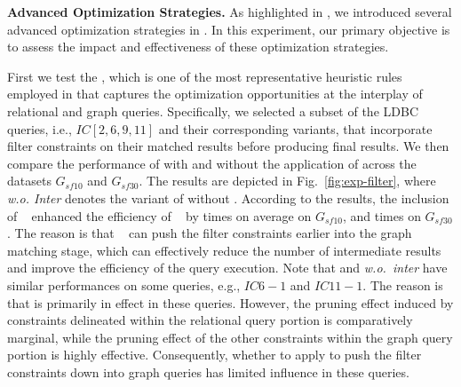 \noindent\textbf{Advanced Optimization Strategies.}
As highlighted in , we introduced several advanced optimization strategies in \name. In this experiment, our primary objective is to assess the impact and effectiveness of these optimization strategies.

First we test the \filterrule {}, which is one of the most representative heuristic rules employed in \name that captures the optimization opportunities at the interplay of relational and graph queries. 
Specifically, we selected a subset of the LDBC queries, i.e., $IC[2,6,9,11]$ and their corresponding variants, that incorporate filter constraints on their matched results before producing final results. We then compare the performance of \name with and without the application of \filterrule across the datasets $G_{sf10}$ and $G_{sf30}$.
The results are depicted in Fig.~\ref{fig:exp-filter}, where \textit{\name w.o. Inter} denotes the variant of \name without \filterrule.
According to the results, the inclusion of \filterrule~ enhanced the efficiency of \name~ by  times on average on $G_{sf10}$, and  times on $G_{sf30}$.
The reason is that \filterrule~ can push the filter constraints earlier into the graph matching stage, which can effectively reduce the number of intermediate results and improve the efficiency of the query execution.
Note that \name and \textit{\name w.o.~inter} have similar performances on some queries, e.g., $IC6-1$ and $IC11-1$.
The reason is that \filterrule is primarily in effect in these queries.
However, the pruning effect induced by constraints delineated within the relational query portion is comparatively marginal, while the pruning effect of the other constraints within the graph query portion is highly effective.
Consequently, whether to apply \filterrule to push the filter constraints down into graph queries has limited influence in these queries.

